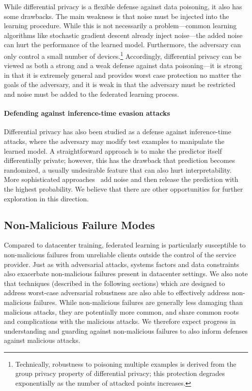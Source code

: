 While differential privacy is a flexible defense against data poisoning, it also has some drawbacks. The main weakness is that noise must be injected into the learning procedure. While this is not necessarily a problem---common learning algorithms like stochastic gradient descent already inject noise---the added noise can hurt the performance of the learned model. Furthermore, the adversary can only control a small number of devices.\footnote{Technically, robustness to poisoning multiple examples is derived from the group privacy property of differential privacy; this protection degrades exponentially as the number of attacked points increases.} Accordingly, differential privacy can be viewed as both a strong and a weak defense against data poisoning---it is strong in that it is extremely general and provides worst case protection no matter the goals of the adversary, and it is weak in that the adversary must be restricted and noise must be added to the federated learning process.

\paragraph{Defending against inference-time evasion attacks}\label{p:inference-time-evasion-defense}
Differential privacy has also been studied as a defense against inference-time attacks, where the adversary may modify test examples to manipulate the learned model. A straightforward approach is to make the predictor itself differentially private; however, this has the drawback that prediction becomes randomized, a usually undesirable feature that can also hurt interpretability. More sophisticated approaches~\citep{DBLP:conf/sp/LecuyerAG0J19} add noise and then release the prediction with the highest probability. We believe that there are other opportunities for further exploration in this direction.


\subsection{Non-Malicious Failure Modes}
\label{subsec:failures}

Compared to datacenter training, federated learning is particularly susceptible to non-malicious failures from unreliable clients outside the control of the service provider. Just as with adversarial attacks, systems factors and data constraints also exacerbate non-malicious failures present in datacenter settings. We also note that techniques (described in the following sections) which are designed to address worst-case adversarial robustness are also able to effectively address non-malicious failures. While non-malicious failures are generally less damaging than malicious attacks, they are potentially more common, and share common roots and complications with the malicious attacks. We therefore expect progress in understanding and guarding against non-malicious failures to also inform defenses against malicious attacks.

